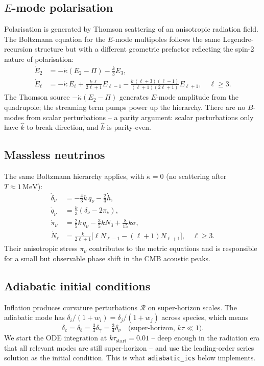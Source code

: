 \subsection{$E$-mode polarisation}

Polarisation is generated by Thomson scattering of an anisotropic radiation field. The Boltzmann equation for the $E$-mode multipoles follows the same Legendre-recursion structure but with a different geometric prefactor reflecting the spin-2 nature of polarisation:
\begin{align}
  \dot E_2 &= -\dot\kappa(E_2 - \Pi) - \tfrac{k}{3}E_3, \\
  \dot E_\ell &= -\dot\kappa\, E_\ell + \frac{k\,\ell}{2\ell+1}E_{\ell-1} - \frac{k\,(\ell + 3)(\ell - 1)}{(\ell + 1)(2\ell + 1)} E_{\ell + 1}, \quad \ell \geq 3.
\end{align}
The Thomson source $-\dot\kappa(E_2 - \Pi)$ generates $E$-mode amplitude from the quadrupole; the streaming term pumps power up the hierarchy. There are no $B$-modes from scalar perturbations -- a parity argument: scalar perturbations only have $\hat k$ to break direction, and $\hat k$ is parity-even.

\subsection{Massless neutrinos}

The same Boltzmann hierarchy applies, with $\dot\kappa = 0$ (no scattering after $T \approx 1\,\mathrm{MeV}$):
\begin{align}
  \dot\delta_\nu &= -\tfrac{4}{3}k\, q_\nu - \tfrac{2}{3}\dot h, \\
  \dot q_\nu &= \tfrac{k}{3}(\delta_\nu - 2 \pi_\nu), \\
  \dot \pi_\nu &= \tfrac{2}{5}k\, q_\nu - \tfrac{3}{5}k N_3 + \tfrac{8}{15}k\sigma, \\
  \dot N_\ell &= \frac{k}{2\ell + 1}\bigl[\ell N_{\ell - 1} - (\ell + 1) N_{\ell + 1}\bigr], \quad \ell \geq 3.
\end{align}
Their anisotropic stress $\pi_\nu$ contributes to the metric equations and is responsible for a small but observable phase shift in the CMB acoustic peaks.

\subsection{Adiabatic initial conditions}

Inflation produces curvature perturbations $\mathcal{R}$ on super-horizon scales. The adiabatic mode has $\delta_i/(1 + w_i) = \delta_j/(1 + w_j)$ across species, which means
\[
  \delta_c = \delta_b = \tfrac{3}{4}\delta_\gamma = \tfrac{3}{4}\delta_\nu \quad\text{(super-horizon, $k\tau \ll 1$)}.
\]
We start the ODE integration at $k\tau_\mathrm{start} = 0.01$ -- deep enough in the radiation era that all relevant modes are still super-horizon -- and use the leading-order series solution as the initial condition. This is what \texttt{adiabatic\_ics} below implements.

